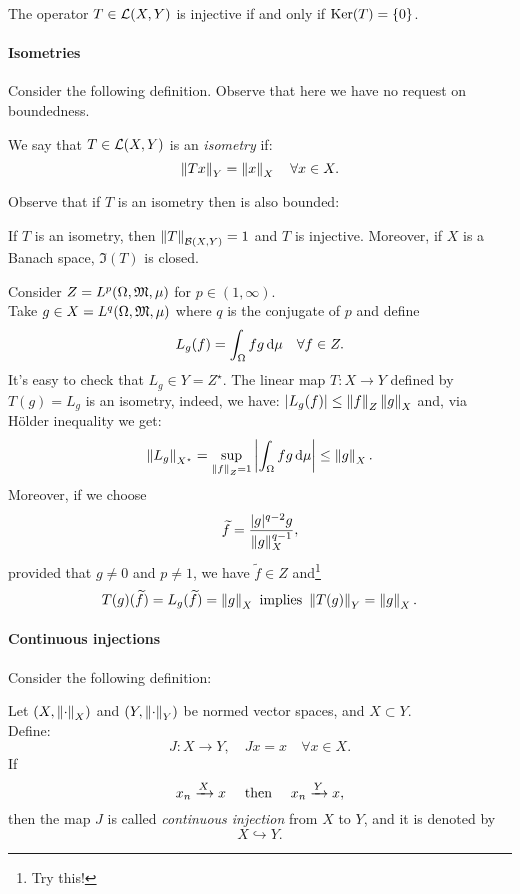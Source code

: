 \begin{prop}
	The operator $T \in \mathcal L(X,Y)$ is injective if and only if $\operatorname{Ker}(T) = \{0\}$.
\end{prop}

\paragraph{Isometries} Consider the following definition. Observe that here we have no request on boundedness.

\begin{defn}
	We say that $T\in \mathcal L(X,Y)$ is an \emph{isometry} if:
	$$\left\lVert Tx\right\rVert_Y = \left\lVert x\right\rVert_X \quad \forall x \in X.$$
\end{defn}

Observe that if $T$ is an isometry then is also bounded:
\begin{prop} \label{prop-isometries}
	If $T$ is an isometry, then $\left\lVert T\right\rVert_{\mathcal B(X,Y)}=1$ and $T$ is injective.
	Moreover, if $X$ is a Banach space, $\Im(T)$ is closed.
\end{prop}


\begin{exam}
	Consider $Z=L^p(\Omega, \mathfrak M, \mu)$ for $p \in (1, \infty)$.\\
	Take $g\in X = L^q(\Omega, \mathfrak M, \mu)$ where $q$ is the conjugate of $p$ and define
	$$L_g(f)= \int_\Omega f g \, \mathrm d \mu \quad \forall f \in Z.$$
	It's easy to check that $L_g \in Y = Z^\star$.
	The linear map $T:X \to Y$ defined by $T(g) = L_g$ is an isometry, indeed, we have:
	$|L_g(f)| \leq \left\lVert f\right\rVert_Z \left\lVert g\right\rVert_X$ and, via Hölder inequality we get:
	$$
		\left\lVert L_g\right\rVert_{X^\star}
		= \sup_{\left\lVert f\right\rVert_Z = 1} \left\lvert\int_\Omega fg \, \mathrm d \mu\right\rvert
		\leq\left\lVert g\right\rVert_X
	.
	$$
	Moreover, if we choose $$\widetilde f = \frac{|g|^{q-2}g}{\left\lVert g\right\rVert_X^{q-1}},$$ provided that $g \neq 0$ and $p \neq 1$, we have $\tilde f \in Z$ and\footnote{Try this!}
	$$
		T(g)(\widetilde f) 
		= L_g(\widetilde f) 
		= \left\lVert g\right\rVert_X
		\text{ implies }
		\left\lVert T(g)\right\rVert_Y 
		= \left\lVert g\right\rVert_X
	.
	$$
\end{exam}

\paragraph{Continuous injections} Consider the following definition:
\begin{defn}
	Let $(X, \left\lVert\cdot\right\rVert_X)$ and $(Y, \left\lVert\cdot\right\rVert_Y)$ be normed vector spaces, and $X \subset Y$.\\
	Define:
	$$
		J:X\to Y, 
		\quad Jx 
		= x 
		\quad \forall x \in X
		.
	$$
	If 
	$$
		x_n \xrightarrow{X} x \quad
		\text{ then } \quad
		x_n \xrightarrow{Y} x
		,
	$$
	then the map $J$ is called \emph{continuous injection} from $X$ to $Y$, and it is denoted by 
	$$
		X 
		\hookrightarrow Y
		.
	$$
\end{defn}

